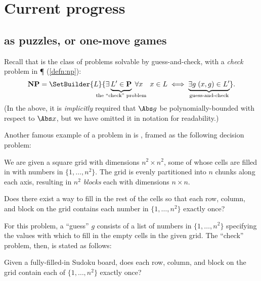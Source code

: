 \chapter{Current progress}

\label{ch:progress}

\section{\NP{} as puzzles, or one-move games}

Recall that \NP{} is the class of problems solvable by guess-and-check, with a
\emph{check} problem in \P{} (\cref{defn:np}):
\[
  \NP = \SetBuilder{L}{
    \exists \underbrace{\mathstrut L' \in \P}_{\mathclap{\text{the ``check'' problem}}} \;
    \forall x \quad
    x \in L \iff \underbrace{\exists g \; (x, g) \in L'}_{\mathclap{\text{guess-and-check}}}
  }.
\]
(In the above, it is \emph{implicitly} required that \(\Abs g\) be
polynomially-bounded with respect to \(\Abs x\), but we have omitted it in
notation for readability.)

Another famous example of a problem in \NP{} is , framed as the
following decision problem:
\begin{definition}%
  We are given a square grid with dimensions \(n^2\times n^2\), some of whose
  cells are filled in with numbers in \(\{1,\dotsc,n^2\}\).  The grid is
  evenly partitioned into \(n\) chunks along each axis, resulting in \(n^2\)
  \emph{blocks} each with dimensions \(n\times n\).

  Does there exist a way to fill in the rest of the cells so that each row,
  column, and block on the grid contains each number in \(\{1,\dotsc,n^2\}\)
  exactly once?
\end{definition}


For this problem, a ``guess'' \(g\) consists of a list of numbers in
\(\{1,\dotsc,n^2\}\) specifying the values with which to fill in the empty
cells in the given grid.  The ``check'' problem, then, is stated as follows:
\begin{nested}
  Given a fully-filled-in Sudoku board, does each row, column, and block on the
  grid contain each of \(\{1,\dotsc,n^2\}\) exactly once?
\end{nested}




%

